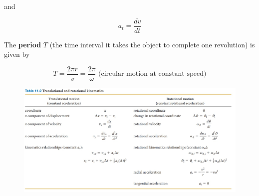        and

        \[
            a_t = \frac{dv}{dt}
        \]

        The \textbf{period} $T$ (the time interval it takes the object to complete one revolution) is given by

        \[
            T = \frac{2\pi r}{v} = \frac{2\pi}{\omega} \text{ (circular motion at constant speed)}
        \]

        \begin{figure}[hbt!]
            \centering
            \includegraphics[scale=0.5]{Resources/translational_vs_rotational}
        \end{figure}